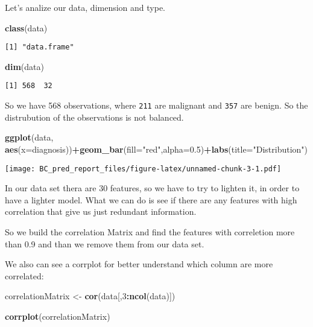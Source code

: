 \documentclass[]{article}
\newenvironment{Shaded}{\begin{snugshade}}{\end{snugshade}}
\newcommand{\DataTypeTok}[1]{\textcolor[rgb]{0.13,0.29,0.53}{#1}}
\newcommand{\DecValTok}[1]{\textcolor[rgb]{0.00,0.00,0.81}{#1}}
\newcommand{\FloatTok}[1]{\textcolor[rgb]{0.00,0.00,0.81}{#1}}
\newcommand{\KeywordTok}[1]{\textcolor[rgb]{0.13,0.29,0.53}{\textbf{#1}}}
\newcommand{\NormalTok}[1]{#1}
\newcommand{\OperatorTok}[1]{\textcolor[rgb]{0.81,0.36,0.00}{\textbf{#1}}}
\newcommand{\StringTok}[1]{\textcolor[rgb]{0.31,0.60,0.02}{#1}}
\begin{document}
Let's analize our data, dimension and type.

\begin{Shaded}
\begin{Highlighting}[]
\KeywordTok{class}\NormalTok{(data)}
\end{Highlighting}
\end{Shaded}

\begin{verbatim}
[1] "data.frame"
\end{verbatim}

\begin{Shaded}
\begin{Highlighting}[]
\KeywordTok{dim}\NormalTok{(data)}
\end{Highlighting}
\end{Shaded}

\begin{verbatim}
[1] 568  32
\end{verbatim}

So we have 568 observations, where \texttt{211} are malignant and
\texttt{357} are benign. So the distrubution of the observations is not
balanced.

\begin{Shaded}
\begin{Highlighting}[]
\KeywordTok{ggplot}\NormalTok{(data, }\KeywordTok{aes}\NormalTok{(}\DataTypeTok{x=}\NormalTok{diagnosis))}\OperatorTok{+}\KeywordTok{geom_bar}\NormalTok{(}\DataTypeTok{fill=}\StringTok{"red"}\NormalTok{,}\DataTypeTok{alpha=}\FloatTok{0.5}\NormalTok{)}\OperatorTok{+}\KeywordTok{labs}\NormalTok{(}\DataTypeTok{title=}\StringTok{"Distribution"}\NormalTok{)}
\end{Highlighting}
\end{Shaded}

\texttt{[image: BC\_pred\_report\_files/figure-latex/unnamed-chunk-3-1.pdf]}

In our data set thera are 30 features, so we have to try to lighten it,
in order to have a lighter model. What we can do is see if there are any
features with high correlation that give us just redundant information.

So we build the correlation Matrix and find the features with
correletion more than 0.9 and than we remove them from our data set.

We also can see a corrplot for better understand which column are more
correlated:

\begin{Shaded}
\begin{Highlighting}[]
\NormalTok{correlationMatrix <-}\StringTok{ }\KeywordTok{cor}\NormalTok{(data[,}\DecValTok{3}\OperatorTok{:}\KeywordTok{ncol}\NormalTok{(data)])}


\KeywordTok{corrplot}\NormalTok{(correlationMatrix)}
\end{Highlighting}
\end{Shaded}
\end{document}
